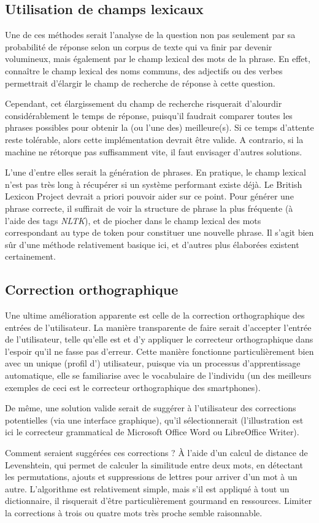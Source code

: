 \subsection{Utilisation de champs lexicaux}%
	Une de ces méthodes serait l'analyse de la question non pas seulement par sa probabilité de réponse selon un corpus de texte qui va finir par devenir volumineux, mais également par le champ lexical des mots de la phrase. En effet, connaître le champ lexical des noms communs, des adjectifs ou des verbes permettrait d'élargir le champ de recherche de réponse à cette question.

	Cependant, cet élargissement du champ de recherche risquerait d'alourdir considérablement le temps de réponse, puisqu'il faudrait comparer toutes les phrases possibles pour obtenir la (ou l'une des) meilleure(s). Si ce temps d'attente reste tolérable, alors cette implémentation devrait être valide. A contrario, si la machine ne rétorque pas suffisamment vite, il faut envisager d'autres solutions.

	L'une d'entre elles serait la génération de phrases. En pratique, le champ lexical n'est pas très long à récupérer si un système performant existe déjà. Le British Lexicon Project devrait a priori pouvoir aider sur ce point. Pour générer une phrase correcte, il suffirait de voir la structure de phrase la plus fréquente (à l'aide des tags \textit{NLTK}), et de piocher dans le champ lexical des mots correspondant au type de token pour constituer une nouvelle phrase. Il s'agit bien sûr d'une méthode relativement basique ici, et d'autres plus élaborées existent certainement.

\subsection{Correction orthographique}
Une ultime amélioration apparente est celle de la correction orthographique des entrées de l'utilisateur. La manière transparente de faire serait d'accepter l'entrée de l'utilisateur, telle qu'elle est et d'y appliquer le correcteur orthographique dans l'espoir qu'il ne fasse pas d'erreur. Cette manière fonctionne particulièrement bien avec un unique (profil d') utilisateur, puisque via un processus d'apprentissage automatique, elle se familiarise avec le vocabulaire de l'individu (un des meilleurs exemples de ceci est le correcteur orthographique des smartphones).

De même, une solution valide serait de suggérer à l'utilisateur des corrections potentielles (via une interface graphique), qu'il sélectionnerait (l'illustration est ici le correcteur grammatical de Microsoft Office Word ou LibreOffice Writer).

Comment seraient suggérées ces corrections ? À l'aide d'un calcul de distance de Levenshtein, qui permet de calculer la similitude entre deux mots, en détectant les permutations, ajouts et suppressions de lettres pour arriver d'un mot à un autre. L'algorithme est relativement simple, mais s'il est appliqué à tout un dictionnaire, il risquerait d'être particulièrement gourmand en ressources. Limiter la corrections à trois ou quatre mots très proche semble raisonnable.